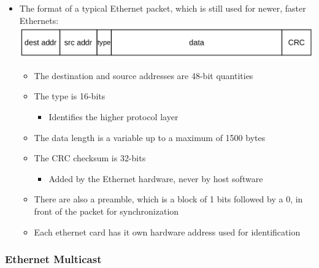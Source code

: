 \documentclass[11pt]{article}
\makeatletter
\def\maxwidth{\ifdim\Gin@nat@width>\linewidth\linewidth
    \else\Gin@nat@width\fi}
\let\Oldincludegraphics\includegraphics
\renewcommand{\includegraphics}[1]{\Oldincludegraphics[width=.8\maxwidth]{#1}}
\providecommand{\tightlist}{%
      \setlength{\itemsep}{0pt}\setlength{\parskip}{0pt}}
\makeatother
\begin{document}
\begin{itemize}
\tightlist
\item
  The format of a typical Ethernet packet, which is still used for
  newer, faster Ethernets: \includegraphics{img/ethernet_format.png}

  \begin{itemize}
  \tightlist
  \item
    The destination and source addresses are 48-bit quantities
  \item
    The type is 16-bits

    \begin{itemize}
    \tightlist
    \item
      Identifies the higher protocol layer
    \end{itemize}
  \item
    The data length is a variable up to a maximum of 1500 bytes\\
  \item
    The CRC checksum is 32-bits

    \begin{itemize}
    \tightlist
    \item
      Added by the Ethernet hardware, never by host software
    \end{itemize}
  \item
    There are also a preamble, which is a block of 1 bits followed by a
    0, in front of the packet for synchronization
  \item
    Each ethernet card has it own hardware address used for
    identification
  \end{itemize}
\end{itemize}

    \subsubsection{Ethernet Multicast}\label{ethernet-multicast}
\end{document}
